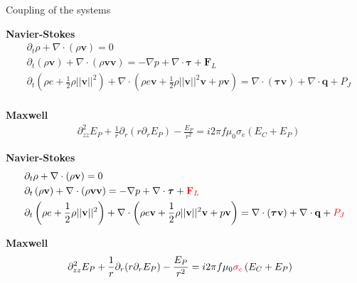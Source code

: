 \documentclass[24pt,t,table, aspectratio=169]{beamer}
\newcommand{\vecF}{\mathbf{F}}
\newcommand{\vecq}{\mathbf{q}}
\newcommand{\vectau}{\boldsymbol{\tau}}
\newcommand{\vecv}{\mathbf{v}}
\begin{document}
\begin{frame}{Coupling of the systems}

{
\textbf{Navier-Stokes}
\begin{equation*}
\begin{aligned}
& \partial_t \rho + \nabla \cdot \left(\rho \vecv\right) = 0\\
& \partial_t \left(\rho \vecv\right) + \nabla \cdot \left(\rho \vecv \vecv \right) = -\nabla p + \nabla \cdot \vectau + \vecF_L\\
& \partial_t \left(\rho e + \frac{1}{2} \rho ||\vecv||^2\right) + \nabla \cdot \left(\rho e \vecv + \frac{1}{2} \rho ||\vecv||^2 \vecv + p \vecv\right) = \nabla \cdot \left(\vectau\vecv\right) + \nabla \cdot \vecq + P_J\\
\end{aligned}
\end{equation*}
}

{
\textbf{Maxwell}
\begin{equation*}
\begin{aligned}
& \partial^2_{zz} E_P + \frac{1}{r}\partial_r (r \partial_r E_P) - \frac{E_P}{r^2} = i 2 \pi f\mu_0\sigma_e \left(E_C + E_P\right)
\end{aligned}
\end{equation*}
}

{
\textbf{Navier-Stokes}
\begin{equation*}
\begin{aligned}
& \partial_t \rho + \nabla \cdot \left(\rho \vecv\right) = 0\\
& \partial_t \left(\rho \vecv\right) + \nabla \cdot \left(\rho \vecv \vecv \right) = -\nabla p + \nabla \cdot \vectau + \textcolor{red}{\vecF_L}\\
& \partial_t \left(\rho e + \frac{1}{2} \rho ||\vecv||^2\right) + \nabla \cdot \left(\rho e \vecv + \frac{1}{2} \rho ||\vecv||^2 \vecv + p \vecv\right) = \nabla \cdot \left(\vectau\vecv\right) + \nabla \cdot \vecq + \textcolor{red}{P_J}\\
\end{aligned}
\end{equation*}

\textbf{Maxwell}
\begin{equation*}
\begin{aligned}
& \partial^2_{zz} E_P + \frac{1}{r}\partial_r (r \partial_r E_P) - \frac{E_P}{r^2} = i 2 \pi f\mu_0\textcolor{red}{\sigma_e} \left(E_C + E_P\right)
\end{aligned}
\end{equation*}
}

\end{frame}
\end{document}
